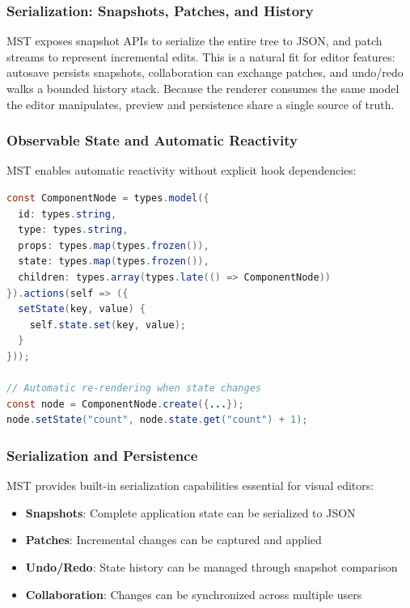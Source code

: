 \documentclass[oneside,12pt]{book}
\begin{document}
\subsubsection{Serialization: Snapshots, Patches, and History}
MST exposes snapshot APIs to serialize the entire tree to JSON, and patch streams to represent incremental edits. This is a natural fit for editor features: autosave persists snapshots, collaboration can exchange patches, and undo/redo walks a bounded history stack. Because the renderer consumes the same model the editor manipulates, preview and persistence share a single source of truth.

\subsubsection{Observable State and Automatic Reactivity}
MST enables automatic reactivity without explicit hook dependencies:

\begin{lstlisting}[language=Java, caption={MST Observable State Example}]
const ComponentNode = types.model({
  id: types.string,
  type: types.string,
  props: types.map(types.frozen()),
  state: types.map(types.frozen()),
  children: types.array(types.late(() => ComponentNode))
}).actions(self => ({
  setState(key, value) {
    self.state.set(key, value);
  }
}));

// Automatic re-rendering when state changes
const node = ComponentNode.create({...});
node.setState("count", node.state.get("count") + 1);
\end{lstlisting}

\subsubsection{Serialization and Persistence}

MST provides built-in serialization capabilities essential for visual editors:

\begin{itemize}
    \item \textbf{Snapshots}: Complete application state can be serialized to JSON
    \item \textbf{Patches}: Incremental changes can be captured and applied
    \item \textbf{Undo/Redo}: State history can be managed through snapshot comparison
    \item \textbf{Collaboration}: Changes can be synchronized across multiple users
\end{itemize}
\end{document}
